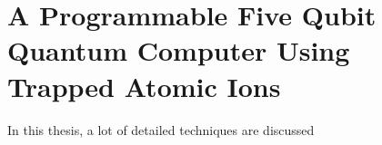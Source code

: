 \section{A Programmable Five Qubit Quantum Computer Using Trapped Atomic Ions} %
\label{sec:a_programmable_five_qubit_quantum_computer_using_trapped_atomic_ions}
In this thesis, a lot of detailed techniques are discussed


